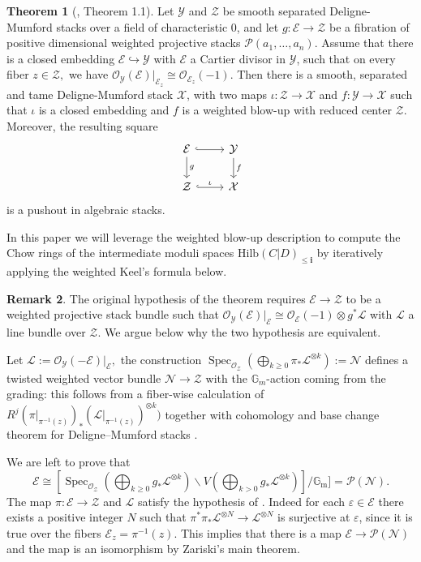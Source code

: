 \documentclass[10.5pt]{amsart}
\theoremstyle{definition}
\theoremstyle{definition}
\theoremstyle{definition}
\theoremstyle{definition}
\newtheorem{theorem}{Theorem}[section]
\newtheorem{remark}[theorem]{Remark}
\newcommand{\Gm}{\mathbb{G}_{\operatorname{m}}}
\newcommand{\Spec}{\operatorname{Spec}}
\newcommand{\Hilb}{\mathrm{Hilb}}
\newcommand{\ra}{\rightarrow}
\newcommand{\cZ}{\mathcal{Z}}
\newcommand{\cE}{\mathcal{E}}
\newcommand{\cP}{\mathcal{P}}
\newcommand{\cX}{\mathcal{X}}
\newcommand{\cO}{\mathcal{O}}
\newcommand{\cY}{\mathcal{Y}}
\newcommand{\cN}{\mathcal{N}}
\newcommand{\cL}{\mathcal{L}}
\newcommand{\bi}{\boldsymbol{i}}
\begin{document}
\begin{theorem}[\cite{arena2024criterion}, Theorem 1.1]\label{thm:blowdown} Let $\cY$ and $\cZ$ be smooth separated Deligne-Mumford stacks over a field of characteristic 0, and let $g: \cE \ra \cZ$ be a fibration of positive dimensional weighted projective stacks $\cP(a_1,\dots,a_n)$. Assume that there is a closed embedding $\cE \hookrightarrow \cY$ with $\cE$ a Cartier divisor in $\cY$, such that on every fiber $z \in \cZ,$ we have $\cO_{\cY}(\cE)|_{\cE_z} \cong \cO_{\cE_z}(-1)$.
Then there is a smooth, separated and tame Deligne-Mumford stack $\cX$, with two maps $\iota: \cZ \ra \cX$ and $f: \cY \ra \cX$ such that $\iota$ is a closed embedding and $f$ is a weighted blow-up with reduced center $\cZ$. Moreover, the resulting square 
$$\begin{tikzcd}
  \cE \arrow[hook]{r} \arrow{d}{g} & \cY \arrow{d}{f} \\
  \cZ \arrow[hook]{r}{\iota} & \cX
\end{tikzcd} $$ is a pushout in algebraic stacks.
\end{theorem}



In this paper we will leverage the weighted blow-up description to compute the Chow rings of the intermediate moduli spaces $\Hilb(C|D)_{\le \bi}$ by iteratively applying the weighted Keel's formula below.




\begin{remark}
    The original hypothesis of the theorem requires $\cE \to \cZ$ to be a weighted projective stack bundle such that $\cO_\cY(\cE)|_{\cE} \cong \cO_\cE(-1) \otimes g^*\cL$ with $\cL$ a line bundle over $\cZ$. We argue below why the two hypothesis are equivalent. 
    
    Let $\cL:=\cO_\cY(-\cE)|_{\cE},$ the construction $\Spec_{\cO_\cZ}(\bigoplus_{k\geq 0} \pi_*\cL^{\otimes k}):=\cN$ defines a twisted weighted vector bundle $\cN \to \cZ$ with the $\mathbb{G}_m$-action coming from the grading: this follows from a fiber-wise calculation of $R^j(\pi|_{\pi^{-1}(z)})_* ({\cL}|_{\pi^{-1}(z)})^{\otimes k})$ together with cohomology and base change theorem for Deligne--Mumford stacks \cite{Hall}. 

    

    We are left to prove that $$\cE \cong [\Spec_{\cO_\cZ}(\bigoplus_{k\ge0} g_*\cL^{\otimes k}) \smallsetminus V(\bigoplus_{k>0} g_*\cL^{\otimes k})]/\Gm]=\cP(\cN).$$ The map $\pi: \cE \ra \cZ$ and $\cL$ satisfy the hypothesis of \cite[Section 1.7.1]{quek-rydh-weighted-blow-up}. Indeed for each $\varepsilon \in \cE$ there exists a positive integer $N$ such that $\pi^*\pi_*\cL^{\otimes N} \to \cL^{\otimes N}$ is surjective at $\varepsilon$, since it is true over the fibers $\cE_z=\pi^{-1}(z)$.
This implies that there is a map $\cE \to \cP(\cN)$ and the map is an isomorphism by Zariski's main theorem.


\end{remark}
\end{document}
